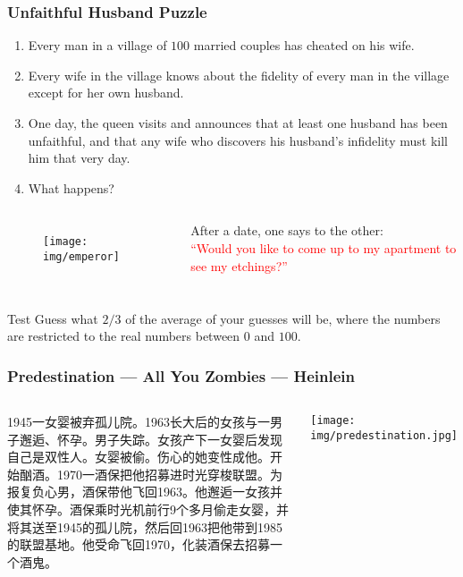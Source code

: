 \documentclass[UTF8,aspectratio=43,11pt,colorlinks,compress,openany]{beamer}%
\begin{document}
\begin{frame}\frametitle{Unfaithful Husband Puzzle}
	\begin{problem}
		\begin{enumerate}
			\item Every man in a village of $100$ married couples has cheated on his wife.
			\item Every wife in the village knows about the fidelity of every man in the village except for her own husband.
			\item One day, the queen visits and announces that at least one husband has been unfaithful, and that any wife who discovers his husband's infidelity must kill him that very day.
			\item What happens?
		\end{enumerate}
	\end{problem}\vspace{-2ex}
\begin{columns}
	\begin{figure}
	\texttt{[image: img/emperor]}
	\end{figure}
	After a date, one says to the other:\\
	\textcolor{red}{``Would you like to come up to my apartment to see my etchings?''}
\end{columns}
\end{frame}

\begin{frame}\frametitle{}
\begin{block}{Test}
Guess what $2/3$ of the average of your guesses will be, where the numbers are restricted to the real numbers between $0$ and $100$.
\end{block}
\end{frame}

\begin{frame}\frametitle{Predestination --- All You Zombies --- Heinlein}
\begin{columns}
\begin{block}{}
1945一女婴被弃孤儿院。1963长大后的女孩与一男子邂逅、怀孕。男子失踪。女孩产下一女婴后发现自己是双性人。女婴被偷。伤心的她变性成他。开始酗酒。1970一酒保把他招募进时光穿梭联盟。为报复负心男，酒保带他飞回1963。他邂逅一女孩并使其怀孕。酒保乘时光机前行9个多月偷走女婴，并将其送至1945的孤儿院，然后回1963把他带到1985的联盟基地。他受命飞回1970，化装酒保去招募一个酒鬼。
\end{block}
\texttt{[image: img/predestination.jpg]}
\end{columns}
\end{frame}
\end{document}
